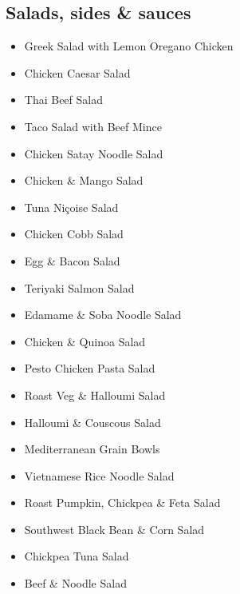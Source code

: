 \subsection*{Salads, sides \& sauces}

\begin{itemize}
  \item \todo Greek Salad with Lemon Oregano Chicken
  \item \todo Chicken Caesar Salad 
  \item \todo Thai Beef Salad 
  \item \todo Taco Salad with Beef Mince
  \item \todo Chicken Satay Noodle Salad
  \item \todo Chicken \& Mango Salad
  \item \todo Tuna Ni\c{c}oise Salad
  \item \todo Chicken Cobb Salad
  \item \todo Egg \& Bacon Salad
  \item \todo Teriyaki Salmon Salad
  \item \todo Edamame \& Soba Noodle Salad
  \item \todo Chicken \& Quinoa Salad
  \item \todo Pesto Chicken Pasta Salad
  \item \todo Roast Veg \& Halloumi Salad
  \item \todo Halloumi \& Couscous Salad
  \item \todo Mediterranean Grain Bowls
  \item \todo Vietnamese Rice Noodle Salad
  \item \todo Roast Pumpkin, Chickpea \& Feta Salad
  \item \todo Southwest Black Bean \& Corn Salad 
  \item \todo Chickpea Tuna Salad
  \item \todo Beef \& Noodle Salad
\end{itemize}

